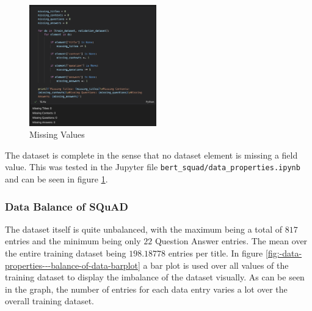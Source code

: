                 \begin{figure}
                    \caption{Missing Values}
                    \begin{center}
                        \includegraphics[width=0.49\textwidth]{figures/data_prop_no_missing_elements.png}
                    \end{center}
                    \label{fig:-data-properties---no-missing-values}
                \end{figure}

                The dataset is complete in the sense that no dataset element is missing a field value. This was tested in the Jupyter file \texttt{bert\_squad/data\_properties.ipynb} and can be seen in figure \ref{fig:-data-properties---no-missing-values}.

            
            \subsubsection{Data Balance of SQuAD}
            \label{subsubsection:-data-properties---balance-of-data}

                The dataset itself is quite unbalanced, with the maximum being a total of $817$ entries and the minimum being only $22$ Question Answer entries. 
                The mean over the entire training dataset being $198.18778$ entries per title.
                In figure \ref{fig:-data-properties---balance-of-data-barplot} a bar plot is used over all values of the training dataset to display the imbalance of the dataset visually.
                As can be seen in the graph, the number of entries for each data entry varies a lot over the overall training dataset.

